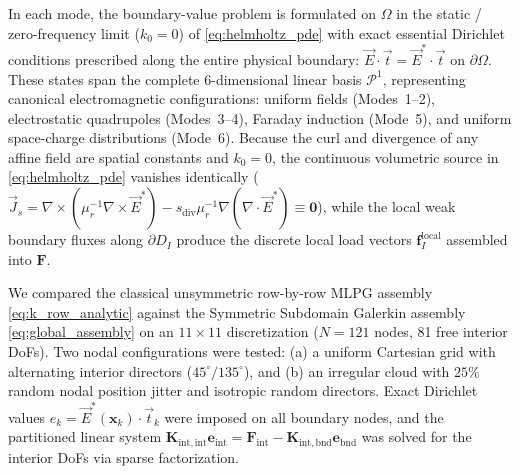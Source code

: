 \documentclass[VANCOUVER]{USG}
\begin{document}
In each mode, the boundary-value problem is formulated on $\Omega$ in the static / zero-frequency limit ($k_0 = 0$) of \eqref{eq:helmholtz_pde} with exact essential Dirichlet conditions prescribed along the entire physical boundary: $\vec{E} \cdot \vec{t} = \vec{E}^* \cdot \vec{t}$ on $\partial\Omega$. These states span the complete 6-dimensional linear basis $\mathcal{P}^1$, representing canonical electromagnetic configurations: uniform fields (Modes~1--2), electrostatic quadrupoles (Modes~3--4), Faraday induction (Mode~5), and uniform space-charge distributions (Mode~6). Because the curl and divergence of any affine field are spatial constants and $k_0 = 0$, the continuous volumetric source in \eqref{eq:helmholtz_pde} vanishes identically ($\vec{J}_s = \nabla \times (\mu_r^{-1}\nabla\times\vec{E}^*) - s_{\mathrm{div}}\mu_r^{-1}\nabla(\nabla\cdot\vec{E}^*) \equiv \mathbf{0}$), while the local weak boundary fluxes along $\partial D_I$ produce the discrete local load vectors $\mathbf{f}_I^{\mathrm{local}}$ assembled into $\mathbf{F}$.

We compared the classical unsymmetric row-by-row MLPG assembly \eqref{eq:k_row_analytic} against the Symmetric Subdomain Galerkin assembly \eqref{eq:global_assembly} on an $11 \times 11$ discretization ($N = 121$ nodes, 81 free interior DoFs). Two nodal configurations were tested: (a) a uniform Cartesian grid with alternating interior directors ($45^\circ / 135^\circ$), and (b) an irregular cloud with $25\%$ random nodal position jitter and isotropic random directors. Exact Dirichlet values $e_k = \vec{E}^*(\mathbf{x}_k) \cdot \vec{t}_k$ were imposed on all boundary nodes, and the partitioned linear system $\mathbf{K}_{\mathrm{int}, \mathrm{int}} \mathbf{e}_{\mathrm{int}} = \mathbf{F}_{\mathrm{int}} - \mathbf{K}_{\mathrm{int}, \mathrm{bnd}} \mathbf{e}_{\mathrm{bnd}}$ was solved for the interior DoFs via sparse factorization.
\end{document}
